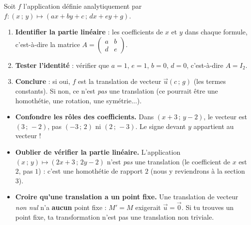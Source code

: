 \documentclass[11pt]{article}
\begin{document}
\begin{methode}
Soit $f$ l'application définie analytiquement par $f : (x\,;\,y) \mapsto (ax + by + c\,;\,dx + ey + g)$.
\begin{enumerate}
\item \textbf{Identifier la partie linéaire} : les coefficients de $x$ et $y$ dans chaque formule, c'est-à-dire la matrice $A = \begin{pmatrix} a & b \\ d & e \end{pmatrix}$.
\item \textbf{Tester l'identité} : vérifier que $a = 1$, $e = 1$, $b = 0$, $d = 0$, c'est-à-dire $A = I_2$.
\item \textbf{Conclure} : si oui, $f$ est la translation de vecteur $\vec{u}(c\,;\,g)$ (les termes constants). Si non, ce n'est \emph{pas} une translation (ce pourrait être une homothétie, une rotation, une symétrie...).
\end{enumerate}
\end{methode}

\begin{attention}
\begin{itemize}
\item \textbf{Confondre les rôles des coefficients.} Dans $(x + 3\,;\,y - 2)$, le vecteur est $(3\,;\,-2)$, pas $(-3\,;\,2)$ ni $(2\,;\,-3)$. Le signe devant $y$ appartient au vecteur !
\item \textbf{Oublier de vérifier la partie linéaire.} L'application $(x\,;\,y) \mapsto (2x + 3\,;\,2y - 2)$ n'est \emph{pas} une translation (le coefficient de $x$ est $2$, pas $1$) : c'est une homothétie de rapport $2$ (nous y reviendrons à la section 3).
\item \textbf{Croire qu'une translation a un point fixe.} Une translation de vecteur \emph{non nul} n'a \textbf{aucun} point fixe : $M' = M$ exigerait $\vec{u} = \vec{0}$. Si tu trouves un point fixe, ta transformation n'est pas une translation non triviale.
\end{itemize}
\end{attention}
\end{document}
